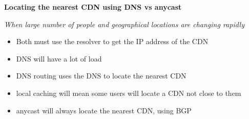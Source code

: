 \documentclass{article}
\begin{document}
\textbf{Locating the nearest CDN using DNS vs anycast}

\textit{When large number of people and geographical locations are changing rapidly}
\begin{itemize}
    \item Both must use the resolver to get the IP address of the CDN
    \item DNS will have a lot of load
    \item DNS routing uses the DNS to locate the nearest CDN
    \item local caching will mean some users will locate a CDN not close to them
    \item anycast will always locate the nearest CDN, using BGP
\end{itemize}
\end{document}
